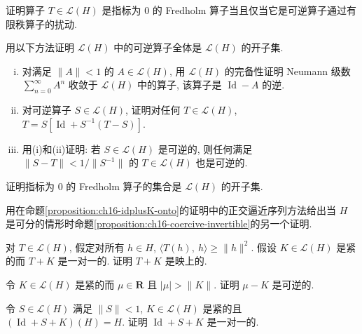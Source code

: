 \documentclass[../../main.tex]{subfiles}
\begin{document}
\begin{exercise}\label{exercise:ch16-57}
证明算子 $T\in\mathcal{L}(H)$ 是指标为 $0$ 的 Fredholm 算子当且仅当它是可逆算子通过有限秩算子的扰动.
\end{exercise}

\begin{exercise}\label{exercise:ch16-58}
用以下方法证明 $\mathcal{L}(H)$ 中的可逆算子全体是 $\mathcal{L}(H)$ 的开子集.
\begin{enumerate}[(i)]
\item 对满足 $\|A\|<1$ 的 $A\in\mathcal{L}(H)$, 用 $\mathcal{L}(H)$ 的完备性证明 Neumann 级数 $\sum_{n=0}^{\infty}A^{n}$ 收敛于 $\mathcal{L}(H)$ 中的算子, 该算子是 $\operatorname{Id}-A$ 的逆.
\item 对可逆算子 $S\in\mathcal{L}(H)$, 证明对任何 $T\in\mathcal{L}(H)$, $T=S[\operatorname{Id}+S^{-1}(T-S)]$.
\item 用(i)和(ii)证明: 若 $S\in\mathcal{L}(H)$ 是可逆的, 则任何满足 $\|S-T\|<1/\|S^{-1}\|$ 的 $T\in\mathcal{L}(H)$ 也是可逆的.
\end{enumerate}
\end{exercise}

\begin{exercise}\label{exercise:ch16-59}
证明指标为 $0$ 的 Fredholm 算子的集合是 $\mathcal{L}(H)$ 的开子集.
\end{exercise}

\begin{exercise}\label{exercise:ch16-60}
用在命题\cref{proposition:ch16-idplusK-onto}的证明中的正交逼近序列方法给出当 $H$ 是可分的情形时命题\cref{proposition:ch16-coercive-invertible}的另一个证明.
\end{exercise}

\begin{exercise}\label{exercise:ch16-61}
对 $T\in\mathcal{L}(H)$, 假定对所有 $h\in H$, $\langle T(h),\ h\rangle\geqslant\|h\|^{2}$. 假设 $K\in\mathcal{L}(H)$ 是紧的而 $T+K$ 是一对一的. 证明 $T+K$ 是映上的.
\end{exercise}

\begin{exercise}\label{exercise:ch16-62}
令 $K\in\mathcal{L}(H)$ 是紧的而 $\mu\in\mathbf{R}$ 且 $|\mu|>\|K\|$. 证明 $\mu-K$ 是可逆的.
\end{exercise}

\begin{exercise}\label{exercise:ch16-63}
令 $S\in\mathcal{L}(H)$ 满足 $\|S\|<1$, $K\in\mathcal{L}(H)$ 是紧的且 $(\operatorname{Id}+S+K)(H)=H$. 证明 $\operatorname{Id}+S+K$ 是一对一的.
\end{exercise}
\end{document}
